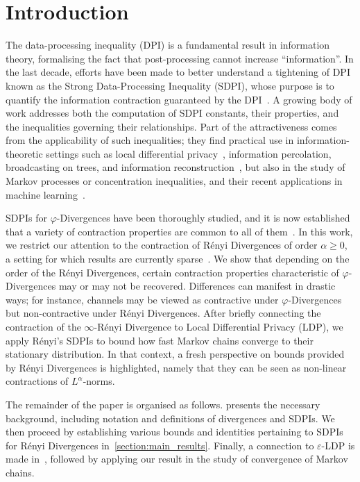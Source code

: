 \documentclass[conference,letterpaper]{IEEEtran}
\begin{document}
\section{Introduction}\noindent
The data-processing inequality (DPI) is a fundamental result in information theory, formalising the fact that post-processing cannot increase ``information''. In the last decade, efforts have been made to better understand a tightening of DPI known as the Strong Data-Processing Inequality (SDPI), whose purpose is to quantify the information contraction guaranteed by the DPI~\cite[Chapter 33]{Polyanskiy2025}. A growing body of work addresses both the computation of SDPI constants, their properties, and the inequalities governing their relationships. Part of the attractiveness comes from the applicability of such inequalities; they find practical use in information-theoretic settings such as local differential privacy~\cite{balle2019privacy,asoodeh2020contraction}, information percolation, broadcasting on trees, and information reconstruction~\cite{polyanskiy2017strong,polyanskiy2020application,gu2023non}, but also in the study of Markov processes or concentration inequalities, and their recent applications in machine learning~\cite{esposito2024concentration,koloskova2025certified,chien2024langevin}.

SDPIs for $\varphi$-Divergences have been thoroughly studied, and it is now established that a variety of contraction properties are common to all of them~\cite{raginsky2016strong}. In this work, we restrict our attention to the contraction of R\'enyi Divergences of order $\alpha\geq 0$, a setting for which results are currently sparse~\cite{jin2024properties,abawonse2025generalized,grosse2025bounds}. We show that depending on the order of the R\'enyi Divergences, certain contraction properties characteristic of \mbox{$\varphi$-Divergences} may or may not be recovered. Differences can manifest in drastic ways; for instance, channels may be viewed as contractive under \mbox{$\varphi$-Divergences} but non-contractive under R\'enyi Divergences. After briefly connecting the contraction of the $\infty$-R\'enyi Divergence to Local Differential Privacy (LDP), we apply R\'enyi's SDPIs to bound how fast Markov chains converge to their stationary distribution. In that context, a fresh perspective on bounds provided by R\'enyi Divergences is highlighted, namely that they can be seen as non-linear contractions of $L^\alpha$-norms.

The remainder of the paper is organised as follows.  presents the necessary background, including notation and definitions of divergences and SDPIs. We then proceed by establishing various bounds and identities pertaining to SDPIs for R\'enyi Divergences in~\cref{section:main_results}. Finally, a connection to $\varepsilon$-LDP is  made in~, followed by applying our result in the study of convergence of Markov chains.
\end{document}
